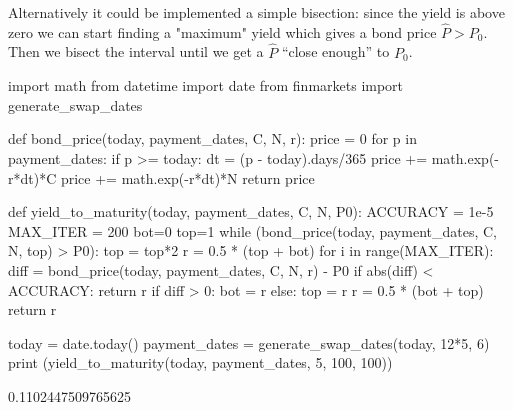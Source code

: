 %



Alternatively it could be implemented a simple bisection: since the yield is above zero we can start finding a "maximum" 
yield which gives a bond price $\hat{P}\gt P_0$. Then we bisect the interval until we get a $\hat{P}$ ``close enough''
to $P_0$.

\begin{ipython}
import math
from datetime import date
from finmarkets import generate_swap_dates

def bond_price(today, payment_dates, C, N, r):
    price = 0
    for p in payment_dates:
        if p >= today:
            dt = (p - today).days/365
            price += math.exp(-r*dt)*C
    price += math.exp(-r*dt)*N
    return price

def yield_to_maturity(today, payment_dates, C, N, P0):
    ACCURACY = 1e-5
    MAX_ITER = 200
    bot=0
    top=1
    while (bond_price(today, payment_dates, C, N, top) > P0):
        top = top*2
        r = 0.5 * (top + bot)
    for i in range(MAX_ITER):
        diff = bond_price(today, payment_dates, C, N, r) - P0
        if abs(diff) < ACCURACY:
            return r
        if diff > 0:
            bot = r
        else:
            top = r
    	r = 0.5 * (bot + top)
    return r

today = date.today()
payment_dates = generate_swap_dates(today, 12*5, 6)
print (yield_to_maturity(today, payment_dates, 5, 100, 100))
\end{ipython}
\begin{ioutput}
0.1102447509765625
\end{ioutput}

